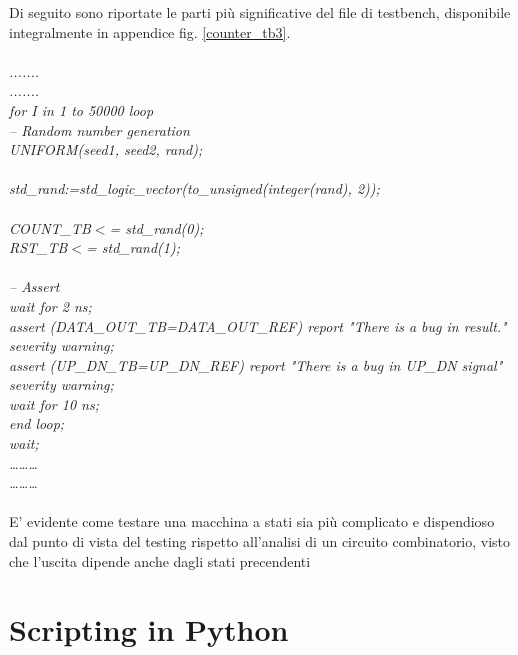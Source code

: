 Di seguito sono riportate le parti più significative del file di testbench, disponibile integralmente in appendice fig. \ref{counter_tb3}.\\
\\
\textit{.......\\
.......\\
for I in 1 to 50000 loop\\
-- Random number generation\\
UNIFORM(seed1, seed2, rand);\\
\\
std\_rand:=std\_logic\_vector(to\_unsigned(integer(rand), 2));\\
\\
COUNT\_TB$<$= std\_rand(0);\\
RST\_TB$<$= std\_rand(1); \\
\\
-- Assert\\
wait for 2 ns;\\
assert (DATA\_OUT\_TB=DATA\_OUT\_REF) report "There is a bug in result." severity warning;\\
assert (UP\_DN\_TB=UP\_DN\_REF) report "There is a bug in UP\_DN signal" severity warning;\\
wait for 10 ns;\\
end loop;\\
wait;\\
………\\
………}\\
\\
E' evidente come testare una macchina a stati sia più complicato e dispendioso dal punto di vista del testing rispetto all'analisi di un circuito combinatorio, visto che l'uscita dipende anche dagli stati precendenti\\ 
\section{Scripting in Python}
